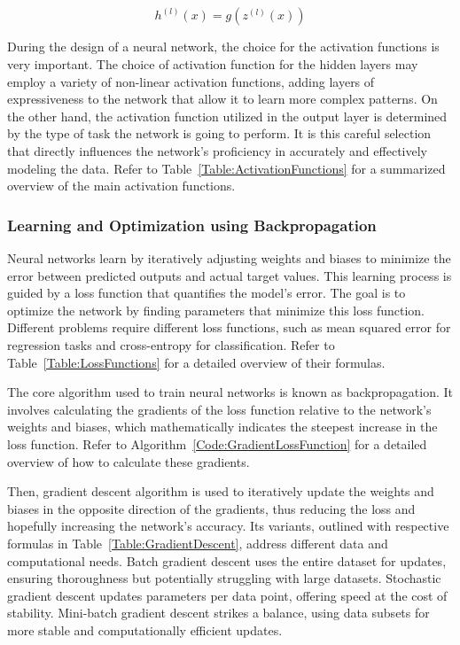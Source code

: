 \begin{equation}
h^{(l)}(x) = g(z^{(l)}(x))
\end{equation}

During the design of a neural network, the choice for the activation functions is very important. The choice of activation function for the hidden layers may employ a variety of non-linear activation functions, adding layers of expressiveness to the network that allow it to learn more complex patterns. On the other hand, the activation function utilized in the output layer is determined by the type of task the network is going to perform. It is this careful selection that directly influences the network's proficiency in accurately and effectively modeling the data. Refer to Table~\ref{Table:ActivationFunctions} for a summarized overview of the main activation functions.



\subsubsection{Learning and Optimization using Backpropagation}
Neural networks learn by iteratively adjusting weights and biases to minimize the error between predicted outputs and actual target values. This learning process is guided by a loss function that quantifies the model's error. The goal is to optimize the network by finding parameters that minimize this loss function. Different problems require different loss functions, such as mean squared error for regression tasks and cross-entropy for classification. Refer to Table~\ref{Table:LossFunctions} for a detailed overview of their formulas.



The core algorithm used to train neural networks is known as backpropagation. It involves calculating the gradients of the loss function relative to the network's weights and biases, which mathematically indicates the steepest increase in the loss function. Refer to Algorithm~\ref{Code:GradientLossFunction} for a detailed overview of how to calculate these gradients.



Then, gradient descent algorithm is used to iteratively update the weights and biases in the opposite direction of the gradients, thus reducing the loss and hopefully increasing the network's accuracy. Its variants, outlined with respective formulas in Table~\ref{Table:GradientDescent}, address different data and computational needs. Batch gradient descent uses the entire dataset for updates, ensuring thoroughness but potentially struggling with large datasets. Stochastic gradient descent updates parameters per data point, offering speed at the cost of stability. Mini-batch gradient descent strikes a balance, using data subsets for more stable and computationally efficient updates.

